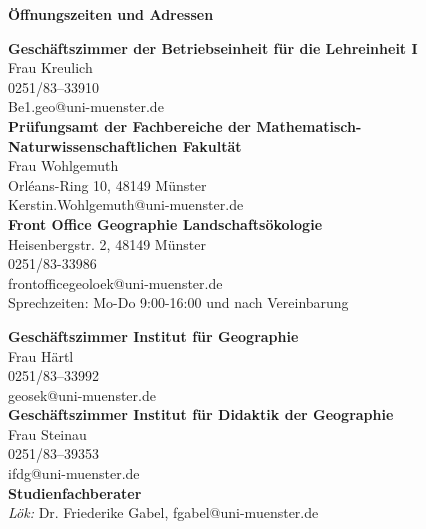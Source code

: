 \begin{small}
\begin{center}
\textbf{ Öffnungszeiten und Adressen}
\end{center}
\end{small}
\begin{tiny}
\sffamily
\begin{minipage}[t]{0.5\textwidth}
 \begin{center}
\textbf{Geschäftszimmer der Betriebseinheit für die Lehreinheit I}\\
Frau Kreulich\\
0251/83--33910 \\
Be1.geo@uni-muenster.de\\
\bigskip 
\textbf{Prüfungsamt der Fachbereiche der Mathematisch- Naturwissenschaftlichen Fakultät}\\
Frau Wohlgemuth\\
Orléans-Ring 10, 48149 Münster\\
Kerstin.Wohlgemuth@uni-muenster.de\\
\bigskip
\textbf{Front Office Geographie Landschaftsökologie}\\
Heisenbergstr. 2, 48149 Münster\\
0251/83-33986\\
frontofficegeoloek@uni-muenster.de\\
Sprechzeiten: Mo-Do 9:00-16:00 und nach Vereinbarung
\bigskip         	
\end{center}
\end{minipage}
\begin{minipage}[t]{0.5\textwidth}
\begin{center}
 \textbf{Geschäftszimmer Institut für Geographie}\\
  Frau Härtl\\
  0251/83--33992\\
  geosek@uni-muenster.de\\
 \bigskip
\textbf{Geschäftszimmer Institut für Didaktik der Geographie}\\
Frau Steinau\\
0251/83--39353\\
ifdg@uni-muenster.de\\
\bigskip
\textbf{Studienfachberater}\\
\textit{Lök:} Dr. Friederike Gabel, fgabel@uni-muenster.de\\

\end{center}
\end{minipage}
\end{tiny}
